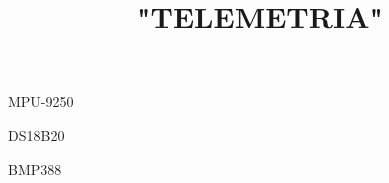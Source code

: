 \documentclass{article}
\begin{document}
\title{"TELEMETRIA"}

MPU-9250

DS18B20

BMP388
\end{document}
